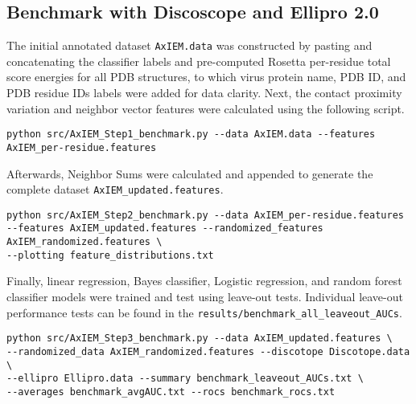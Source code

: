 \documentclass[10pt]{article}
\begin{document}
\subsection{Benchmark with Discoscope and Ellipro 2.0}

The initial annotated dataset \texttt{AxIEM.data} was constructed by pasting and concatenating the classifier labels and pre-computed Rosetta per-residue total score energies for all PDB structures, to which virus protein name, PDB ID, and PDB residue IDs labels were added for data clarity. Next, the contact proximity variation and neighbor vector features were calculated using the following script.
\begin{lstlisting}
python src/AxIEM_Step1_benchmark.py --data AxIEM.data --features AxIEM_per-residue.features
\end{lstlisting}

Afterwards, Neighbor Sums were calculated and appended to generate the complete dataset \texttt{AxIEM\_updated.features}.
\begin{lstlisting}
python src/AxIEM_Step2_benchmark.py --data AxIEM_per-residue.features
--features AxIEM_updated.features --randomized_features AxIEM_randomized.features \
--plotting feature_distributions.txt
\end{lstlisting}

Finally, linear regression, Bayes classifier, Logistic regression, and random forest classifier models were trained and test using leave-out tests. Individual leave-out performance tests can be found in the \texttt{results/benchmark\_all\_leaveout\_AUCs}.
\begin{lstlisting}
python src/AxIEM_Step3_benchmark.py --data AxIEM_updated.features \
--randomized_data AxIEM_randomized.features --discotope Discotope.data \
--ellipro Ellipro.data --summary benchmark_leaveout_AUCs.txt \
--averages benchmark_avgAUC.txt --rocs benchmark_rocs.txt
\end{lstlisting}
\end{document}
